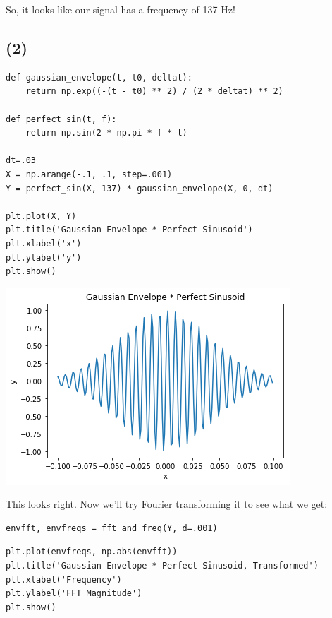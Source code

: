 \documentclass[11pt]{article}
\begin{document}
So, it looks like our signal has a frequency of 137 Hz!

\subsection*{(2)}
\label{sec-2-2}

\begin{verbatim}
def gaussian_envelope(t, t0, deltat):
    return np.exp((-(t - t0) ** 2) / (2 * deltat) ** 2)

def perfect_sin(t, f):
    return np.sin(2 * np.pi * f * t)

dt=.03
X = np.arange(-.1, .1, step=.001)
Y = perfect_sin(X, 137) * gaussian_envelope(X, 0, dt)

plt.plot(X, Y)
plt.title('Gaussian Envelope * Perfect Sinusoid')
plt.xlabel('x')
plt.ylabel('y')
plt.show()
\end{verbatim}

\includegraphics[width=.9\linewidth]{./obipy-resources/333qUZ.png}

This looks right. Now we'll try Fourier transforming it to see what we get:

\begin{verbatim}
envfft, envfreqs = fft_and_freq(Y, d=.001)
\end{verbatim}


\begin{verbatim}
plt.plot(envfreqs, np.abs(envfft))
plt.title('Gaussian Envelope * Perfect Sinusoid, Transformed')
plt.xlabel('Frequency')
plt.ylabel('FFT Magnitude')
plt.show()
\end{verbatim}
\end{document}
